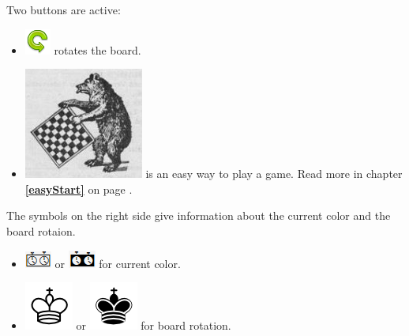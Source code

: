 \documentclass[11pt,a4paper]{article}
\begin{document}
Two buttons are active:
\begin{itemize}
  \item \includegraphics[scale=0.5]{arrow_rotate_anticlockwise.png} rotates the board.
  \item \includegraphics[scale=0.2]{bearchess_2.png} is an easy way to play a game.
Read more in chapter \textbf{\ref{easyStart}  } on page \pageref{easyStart}.
\end{itemize}
The symbols on the right side give information about the current color and the board rotaion.
\begin{itemize}
	\item \includegraphics[scale=0.6]{WhiteClock.png} or \includegraphics[scale=0.6]{BlackClock.png} for current color.
	\item \includegraphics[scale=0.3]{KingW.png}  or \includegraphics[scale=0.3]{KingB.png} for board rotation. 
\end{itemize}
\end{document}
